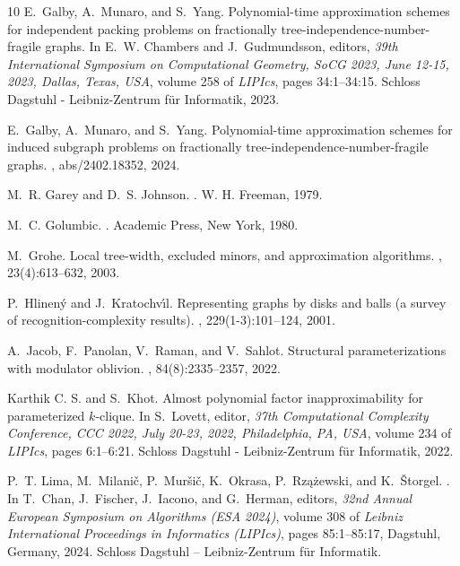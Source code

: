 \documentclass[11pt]{article}
\theoremstyle{definition}
\begin{document}
\begin{thebibliography}{10}
E.~Galby, A.~Munaro, and S.~Yang.
\newblock Polynomial-time approximation schemes for independent packing
  problems on fractionally tree-independence-number-fragile graphs.
\newblock In E.~W. Chambers and J.~Gudmundsson, editors, {\em 39th
  International Symposium on Computational Geometry, SoCG 2023, June 12-15,
  2023, Dallas, Texas, {USA}}, volume 258 of {\em LIPIcs}, pages 34:1--34:15.
  Schloss Dagstuhl - Leibniz-Zentrum f{\"{u}}r Informatik, 2023.

E.~Galby, A.~Munaro, and S.~Yang.
\newblock Polynomial-time approximation schemes for induced subgraph problems
  on fractionally tree-independence-number-fragile graphs.
, abs/2402.18352, 2024.

M.~R. Garey and D.~S. Johnson.
.
\newblock W. H. Freeman, 1979.

M.~C. Golumbic.
.
\newblock Academic Press, New York, 1980.

M.~Grohe.
\newblock Local tree-width, excluded minors, and approximation algorithms.
, 23(4):613--632, 2003.

P.~Hlinen{\'{y}} and J.~Kratochv{\'{\i}}l.
\newblock Representing graphs by disks and balls (a survey of
  recognition-complexity results).
, 229(1-3):101--124, 2001.

A.~Jacob, F.~Panolan, V.~Raman, and V.~Sahlot.
\newblock Structural parameterizations with modulator oblivion.
, 84(8):2335--2357, 2022.

{Karthik {C. S.}} and S.~Khot.
\newblock Almost polynomial factor inapproximability for parameterized
  $k$-clique.
\newblock In S.~Lovett, editor, {\em 37th Computational Complexity Conference,
  {CCC} 2022, July 20-23, 2022, Philadelphia, PA, {USA}}, volume 234 of {\em
  LIPIcs}, pages 6:1--6:21. Schloss Dagstuhl - Leibniz-Zentrum f{\"{u}}r
  Informatik, 2022.

P.~T. Lima, M.~Milanič, P.~Muršič, K.~Okrasa, P.~Rzążewski, and
  K.~Štorgel.
.
\newblock In T.~Chan, J.~Fischer, J.~Iacono, and G.~Herman, editors, {\em 32nd
  Annual European Symposium on Algorithms (ESA 2024)}, volume 308 of {\em
  Leibniz International Proceedings in Informatics (LIPIcs)}, pages
  85:1--85:17, Dagstuhl, Germany, 2024. Schloss Dagstuhl -- Leibniz-Zentrum
  f{\"u}r Informatik.


\end{thebibliography}
\end{document}
